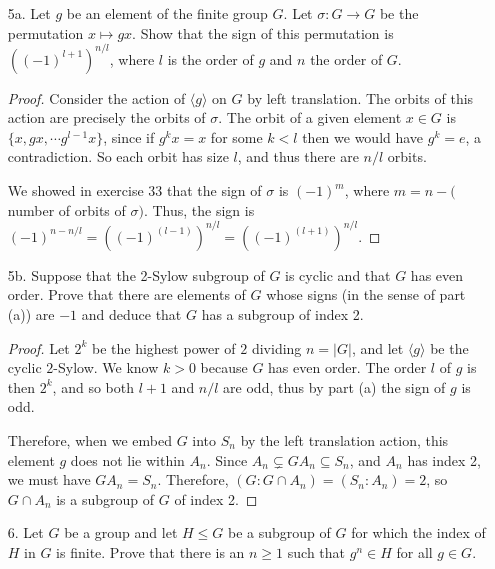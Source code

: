\documentclass[10pt]{article}
\newcommand{\gen}[1]{\langle #1 \rangle}
\begin{document}
\begin{enumerate}
\begin{proof}
Since $H$ has prime index in $G$, we must have either $N = H$ or $N = G$.  But $N$ contains $x$, which is not in $H$ by assumption.  Therefore $N = G$, so $H$ is normal.
\end{proof}

\item[5a.] Let $g$ be an element of the finite group $G$.  Let $\sigma:G \rightarrow G$ be the permutation $x \mapsto gx$.  Show that the sign of this permutation is $((-1)^{l+1})^{n/l}$, where $l$ is the order of $g$ and $n$ the order of $G$.

\begin{proof}

Consider the action of $\gen{g}$ on $G$ by left translation.  The orbits of this action are precisely the orbits of $\sigma$.  The orbit of a given element $x \in G$ is $\{x, gx , \cdots g^{l-1}x\}$, since if $g^k x = x$ for some $k < l$ then we would have $g^k = e$, a contradiction.  So each orbit has size $l$, and thus there are $n/l$ orbits.

We showed in exercise 33 that the sign of $\sigma$ is $(-1)^m$, where $m = n - ($number of orbits of $\sigma)$.  Thus, the sign is $(-1)^{n-n/l} = ((-1)^{(l-1)})^{n/l} = ((-1)^{(l+1)})^{n/l}$.

\end{proof}

\item[5b.] Suppose that the 2-Sylow subgroup of $G$ is cyclic and that $G$ has even order.  Prove that there are elements of $G$ whose signs (in the sense of part (a)) are $-1$ and deduce that $G$ has a subgroup of index 2.

\begin{proof}
Let $2^k$ be the highest power of $2$ dividing $n = |G|$, and let $\gen{g}$ be the cyclic $2$-Sylow.  We know $k > 0$ because $G$ has even order.  The order $l$ of $g$ is then $2^k$, and so both $l+1$ and $n/l$ are odd, thus by part (a) the sign of $g$ is odd.

Therefore, when we embed $G$ into $S_n$ by the left translation action, this element $g$ does not lie within $A_n$.  Since $A_n \subsetneq GA_n \subseteq S_n$, and $A_n$ has index 2, we must have $GA_n = S_n$.  Therefore, $(G : G \cap A_n) = (S_n : A_n) = 2$, so $G \cap A_n$ is a subgroup of $G$ of index 2.
\end{proof}

\item[6.] Let $G$ be a group and let $H \leq G$ be a subgroup of $G$ for which the index of $H$ in $G$ is finite.  Prove that there is an $n \geq 1$ such that $g^n \in H$ for all $g \in G$.


\end{enumerate}
\end{document}
